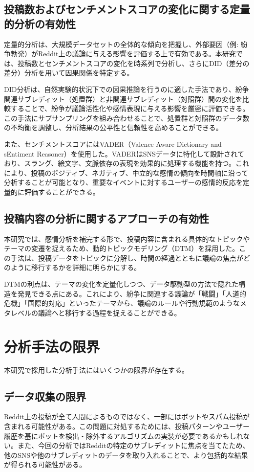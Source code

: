\documentclass[11pt, a4j]{jreport}
\begin{document}
    \subsection{投稿数およびセンチメントスコアの変化に関する定量的分析の有効性}
    定量的分析は、大規模データセットの全体的な傾向を把握し、外部要因（例: 紛争勃発）がReddit上の議論に与える影響を評価する上で有効である。本研究では、投稿数とセンチメントスコアの変化を時系列で分析し、さらにDID（差分の差分）分析を用いて因果関係を特定する。

    DID分析は、自然実験的状況下での因果推論を行うのに適した手法であり、紛争関連サブレディット（処置群）と非関連サブレディット（対照群）間の変化を比較することで、紛争が議論活性化や感情表現に与える影響を厳密に評価できる。この手法にサブサンプリングを組み合わせることで、処置群と対照群のデータ数の不均衡を調整し、分析結果の公平性と信頼性を高めることができる。

    また、センチメントスコアにはVADER（Valence Aware Dictionary and sEntiment Reasoner）を使用した。VADERはSNSデータに特化して設計されており、スラング、絵文字、文脈依存の表現を効果的に処理する機能を持つ。これにより、投稿のポジティブ、ネガティブ、中立的な感情の傾向を時間軸に沿って分析することが可能となり、重要なイベントに対するユーザーの感情的反応を定量的に評価することができる。

    \subsection{投稿内容の分析に関するアプローチの有効性}
    本研究では、感情分析を補完する形で、投稿内容に含まれる具体的なトピックやテーマの変遷を捉えるため、動的トピックモデリング（DTM）を採用した。この手法は、投稿データをトピックに分解し、時間の経過とともに議論の焦点がどのように移行するかを詳細に明らかにする。

    DTMの利点は、テーマの変化を定量化しつつ、データ駆動型の方法で隠れた構造を発見できる点にある。これにより、紛争に関連する議論が「戦闘」「人道的危機」「国際的対応」といったテーマから、議論のルールや行動規範のようなメタレベルの議論へと移行する過程を捉えることができる。

    \section{分析手法の限界}
    本研究で採用した分析手法にはいくつかの限界が存在する。
    
    \subsection{データ収集の限界}
    Reddit上の投稿が全て人間によるものではなく、一部にはボットやスパム投稿が含まれる可能性がある。この問題に対処するためには、投稿パターンやユーザー履歴を基にボットを検出・除外するアルゴリズムの実装が必要であるかもしれない。また、今回の分析ではRedditの特定のサブレディットに焦点を当てたため、他のSNSや他のサブレディットのデータを取り入れることで、より包括的な結果が得られる可能性がある。
    
\end{document}
